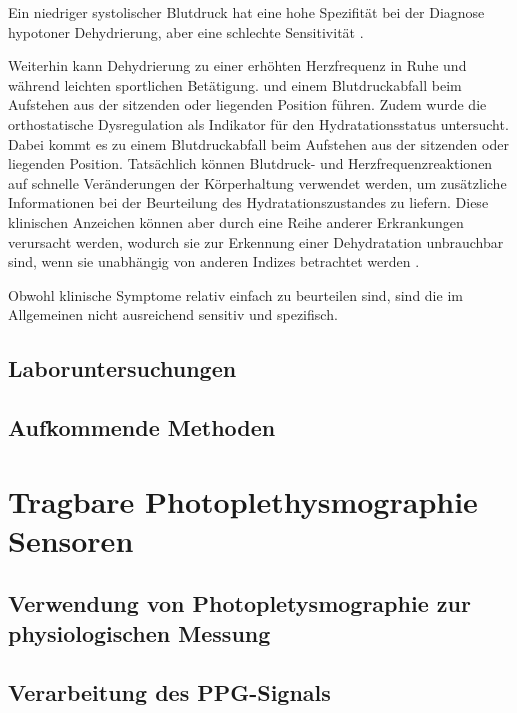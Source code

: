 \documentclass[10pt,a4paper,headinclude,twoside, plainheadsepline, open=right, numbers=noenddot, twocolumn]{article}
\begin{document}
Ein niedriger systolischer Blutdruck hat eine hohe Spezifität bei der Diagnose hypotoner Dehydrierung, aber eine schlechte Sensitivität \cite{fortes2015elderly}.

Weiterhin kann Dehydrierung zu einer erhöhten Herzfrequenz in Ruhe und während leichten sportlichen Betätigung.
und einem Blutdruckabfall beim Aufstehen aus der sitzenden oder liegenden Position führen.
Zudem wurde die orthostatische Dysregulation als Indikator für den Hydratationsstatus untersucht. Dabei kommt es zu einem Blutdruckabfall beim Aufstehen aus der sitzenden oder liegenden Position.
Tatsächlich können Blutdruck- und Herzfrequenzreaktionen auf schnelle Veränderungen der Körperhaltung verwendet werden, um zusätzliche Informationen bei der Beurteilung des Hydratationszustandes zu liefern.
Diese klinischen Anzeichen können aber durch eine Reihe anderer Erkrankungen verursacht werden, wodurch sie zur Erkennung einer Dehydratation unbrauchbar sind, wenn sie unabhängig von anderen Indizes betrachtet werden
\cite{garret2018engineering}
\cite{kavouras2002assessing}
\cite{davis1997effect}.

Obwohl klinische Symptome relativ einfach zu beurteilen sind, sind die im Allgemeinen nicht ausreichend sensitiv und spezifisch.

\subsection{Laboruntersuchungen}
\label{laboruntersuchungen}


\subsection{Aufkommende Methoden}
\label{aufkommende methoden}


\section{Tragbare Photoplethysmographie Sensoren}
\label{tragbare photoplethysmographie sensoren}


\subsection{Verwendung von Photopletysmographie zur physiologischen Messung}
\label{verwendung von photopletysmographie zur physiologischen messung}


\subsection{Verarbeitung des PPG-Signals}
\label{verarbeitung des ppg-signals}
\end{document}
